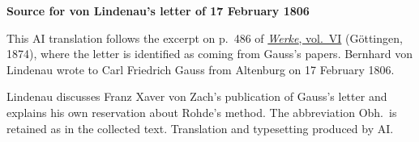\clearpage\thispagestyle{empty}
\begin{center}\textbf{Source for von Lindenau’s letter of 17 February 1806}\end{center}
\noindent This AI translation follows the excerpt on p.~486 of \href{https://gdz.sub.uni-goettingen.de/id/PPN236007467}{\textit{Werke}, vol.~VI} (Göttingen, 1874), where the letter is identified as coming from Gauss’s papers. Bernhard von Lindenau wrote to Carl Friedrich Gauss from Altenburg on 17 February 1806.
\par\smallskip\noindent Lindenau discusses Franz Xaver von Zach’s publication of Gauss’s letter and explains his own reservation about Rohde’s method. The abbreviation Obh.\ is retained as in the collected text. Translation and typesetting produced by AI.
\clearpage
